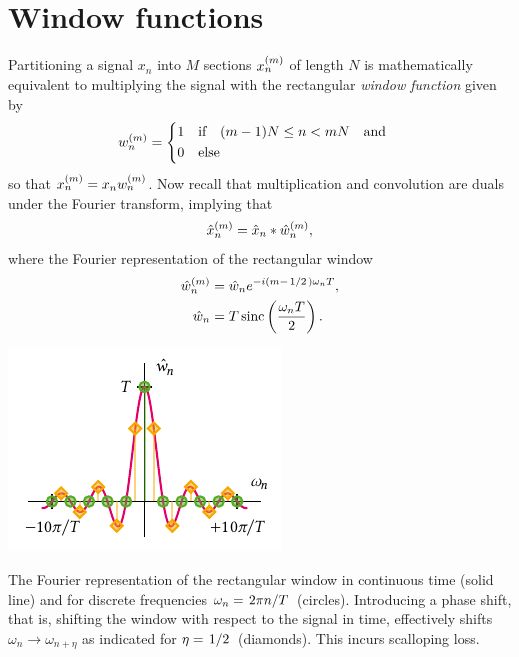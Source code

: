 \section{Window functions}\label{sec:speck:theory:windows}
Partitioning a signal $x_n$ into $M$ sections $x_n^{(m)}$ of length $N$ is mathematically equivalent to multiplying the signal with the rectangular \emph{window function} given by
\begin{align}\label{eq:speck:window:boxcar}
    w_n\gth{m} =
    \begin{dcases}
        1 &\qif* (m - 1) N \leq n < m N\qand \\
        0 &\qelse*
    \end{dcases}
\end{align}
so that $x_n^{(m)} = x_n w_n^{(m)}$.
Now recall that multiplication and convolution are duals under the Fourier transform, implying that
\begin{align}\label{eq:speck:window:ft_pairs}
    \hat{x}_n^{(m)} = \hat{x}_n \ast \hat{w}_n^{(m)},
\end{align}
where the Fourier representation of the rectangular window
\begin{align}
    \hat{w}_n\gth{m} &= \hat{w}_n \e^{-\i(m - \flatfrac{1}{2})\omega_n T}, \label{eq:speck:window:boxcar:fourier}\\
             \hat{w}_n &= T\sinc\left(\frac{\omega_n T}{2}\right). \label{eq:speck:window:boxcar:fourier:unshifted}
\end{align}
\begin{marginfigure}
    \centering
    \includegraphics{img/pdf/spectrometer/rect}
    \caption[]{
        The Fourier representation of the rectangular window in continuous time (solid line) and for discrete frequencies $\omega_n = \flatfrac{2\pi n}{T}$ (circles).
        Introducing a phase shift, that is, shifting the window with respect to the signal in time, effectively shifts $\omega_n \to \omega_{n+\eta}$ as indicated for $\eta=\flatfrac{1}{2}$ (diamonds).
        This incurs scalloping loss.
    }
    \label{fig:speck:boxcar_fourier}
\end{marginfigure}

